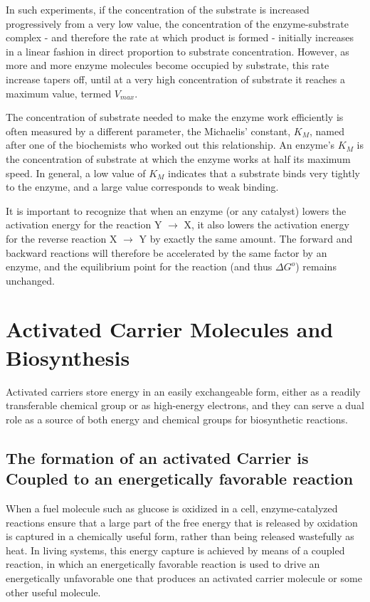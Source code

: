 In such experiments, if the concentration of the substrate is increased
progressively from a very low value, the concentration of the enzyme-substrate
complex - and therefore the rate at which product is formed - initially increases
in a linear fashion in direct proportion to substrate concentration.
However, as more and more enzyme molecules become occupied by substrate,
this rate increase tapers off, until at a very high concentration of substrate
it reaches a maximum value, termed \textbf{$V_{max}$}.

The concentration of substrate needed to make the enzyme work efficiently
is often measured by a different parameter, the Michaelis’ constant,
\textbf{$K_M$}, named after one of the biochemists who worked out this relationship.
An enzyme’s $K_M$ is the concentration of substrate at which the enzyme
works at half its maximum speed. In general, a low
value of $K_M$ indicates that a substrate binds very tightly to the enzyme,
and a large value corresponds to weak binding.

It is important to recognize that when an enzyme (or any catalyst) lowers
the activation energy for the reaction Y $\rightarrow$ X, it also lowers the activation
energy for the reverse reaction X $\rightarrow$ Y by exactly the same amount.
The forward and backward reactions will therefore be accelerated by the same factor
by an enzyme, and the equilibrium point for the reaction (and thus $\Delta G^{o}$)
remains unchanged.

\section{Activated Carrier Molecules and Biosynthesis}

Activated carriers store energy in an easily exchangeable form, either
as a readily transferable chemical group or as high-energy electrons,
and they can serve a dual role as a source of both energy and chemical
groups for biosynthetic reactions.

\subsection{The formation of an activated Carrier is Coupled to an energetically favorable reaction}

When a fuel molecule such as glucose is oxidized in a cell, enzyme-catalyzed
reactions ensure that a large part of the free energy that is released
by oxidation is captured in a chemically useful form, rather than being
released wastefully as heat. In living systems, this energy capture is achieved by means of a
coupled reaction, in which an energetically favorable reaction is used to
drive an energetically unfavorable one that produces an activated carrier
molecule or some other useful molecule.

